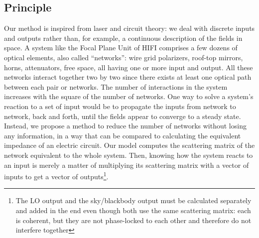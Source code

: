 \documentclass[a4paper,11pt]{article}
\begin{document}
\subsection{Principle}
Our method is inspired from laser and circuit theory: we deal with discrete inputs and outputs rather than, for example, a continuous description of the fields in space.
A system like the Focal Plane Unit of HIFI comprises a few dozens of optical elements, also called ``networks'': wire grid polarizers, roof-top mirrors, horns, attenuators, free space, all having one or more input and output.
All these networks interact together two by two since there exists at least one optical path between each pair or networks.
The number of interactions in the system increases with the square of the number of networks.
One way to solve a system's reaction to a set of input would be to propagate the inputs from network to network, back and forth, until the fields appear to converge to a steady state.
Instead, we propose a method to reduce the number of networks without losing any information, in a way that can be compared to calculating the equivalent impedance of an electric circuit.
Our model computes the scattering matrix of the network equivalent to the whole system.
Then, knowing how the system reacts to an input is merely a matter of multiplying its scattering matrix with a vector of inputs to get a vector of outputs\footnote{The LO output and the sky/blackbody output must be calculated separately and added in the end even though both use the same scattering matrix: each is coherent, but they are not phase-locked to each other and therefore do not interfere together}.
\end{document}
